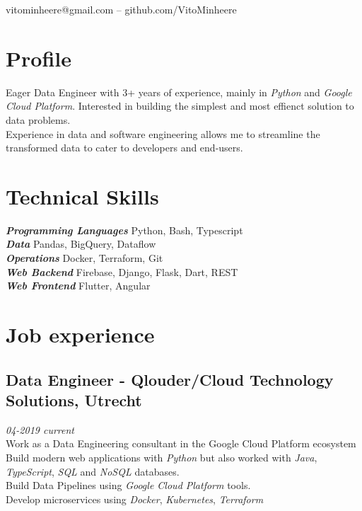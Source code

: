 \documentclass{article}
\makeatletter
\renewcommand{\maketitle}{
\begin{center}
	{\huge\bfseries
	\theauthor}

\vspace*{1cm}
vitominheere@gmail.com -- github.com/VitoMinheere

\end{center}
}
\makeatother
\begin{document}
\author{Vito Minheere}


\maketitle

\section{\sc Profile}
Eager Data Engineer with 3+ years of experience, mainly in \emph{Python} and \emph{Google Cloud Platform}. Interested in building the simplest and most effienct solution to data problems. \\
Experience in data and software engineering allows me to streamline the transformed data to cater to developers and end-users.

\section{\sc Technical Skills}
{\sl \textbf{Programming Languages}} Python, Bash, Typescript \\
{\sl \textbf{Data }} Pandas, BigQuery, Dataflow \\
{\sl \textbf{Operations }} Docker, Terraform, Git \\
{\sl \textbf{Web Backend }} Firebase, Django, Flask, Dart, REST \\
{\sl \textbf{Web Frontend }} Flutter, Angular \\

\section{\sc Job experience}
\subsection{Data Engineer - Qlouder/Cloud Technology Solutions, Utrecht} \hfill {\em 04-2019 current} \\
Work as a Data Engineering consultant in the Google Cloud Platform ecosystem \\
Build modern web applications with \emph{Python} but also worked with \emph{Java}, \emph{TypeScript}, \emph{SQL} and \emph{NoSQL} databases. \\ 
Build Data Pipelines using \emph{Google Cloud Platform} tools. \\
Develop microservices using \emph{Docker}, \emph{Kubernetes}, \emph{Terraform} \\
\end{document}
